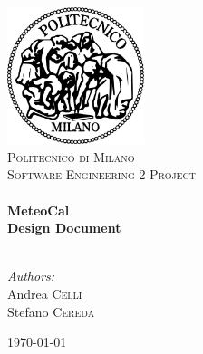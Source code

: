\begin{titlepage}
\begin{center}

\includegraphics[width=0.30\textwidth]{./logo}~\\[1cm]
\textsc{\LARGE Politecnico di Milano}\\[1.5cm]

\textsc{\Large Software Engineering 2 Project}\\[0.5cm]

\HRule \\[0.4cm]
{ \Huge \bfseries MeteoCal \\[0.4cm] }
{ \huge \bfseries Design Document \\[0.4cm] }
\HRule \\[1.5cm]

\begin{flushright}
\noindent
\large
\emph{Authors:}\\
Andrea \textsc{Celli}\\
Stefano \textsc{Cereda}
\end{flushright}
\vfill

{\large \today}

\end{center}
\end{titlepage}